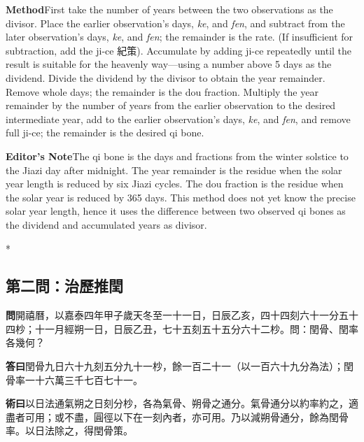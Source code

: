 \documentclass[11pt,a4paper]{article}
\newcommand{\WenCN}{\textbf{\color{headcolor}問}}
\newcommand{\DaCN}{\textbf{\color{headcolor}答曰}}
\newcommand{\ShuCN}{\textbf{\color{headcolor}術曰}}
\newcommand{\ShuEN}{\textbf{\color{headcolor}Method}}
\newcommand{\AnEN}{\textbf{\color{headcolor}Editor's Note}}
\begin{document}
\vspace{0.5em}
\ShuEN{}\quad First take the number of years between the two observations as the divisor. Place the earlier observation's days, \textit{ke}, and \textit{fen}, and subtract from the later observation's days, \textit{ke}, and \textit{fen}; the remainder is the rate. (If insufficient for subtraction, add the ji-ce 紀策). Accumulate by adding ji-ce repeatedly until the result is suitable for the heavenly way---using a number above 5 days as the dividend. Divide the dividend by the divisor to obtain the year remainder. Remove whole days; the remainder is the dou fraction. Multiply the year remainder by the number of years from the earlier observation to the desired intermediate year, add to the earlier observation's days, \textit{ke}, and \textit{fen}, and remove full ji-ce; the remainder is the desired qi bone.

\vspace{0.5em}
\AnEN{}\quad The qi bone is the days and fractions from the winter solstice to the Jiazi day after midnight. The year remainder is the residue when the solar year length is reduced by six Jiazi cycles. The dou fraction is the residue when the solar year is reduced by 365 days. This method does not yet know the precise solar year length, hence it uses the difference between two observed qi bones as the dividend and accumulated years as divisor.

\newpage

\switchcolumn[0]*
\subsection*{第二問：治歷推閏}

\vspace{0.5em}
\WenCN{}\quad 開禧曆，以嘉泰四年甲子歲天冬至一十一日，日辰乙亥，四十四刻六十一分五十四杪；十一月經朔一日，日辰乙丑，七十五刻五十五分六十二杪。問：閏骨、閏率各幾何？

\vspace{0.5em}
\DaCN{}\quad 閏骨九日六十九刻五分九十一杪，餘一百二十一（以一百六十九分為法）；閏骨率一十六萬三千七百七十一。

\vspace{0.5em}
\ShuCN{}\quad 以日法通氣朔之日刻分杪，各為氣骨、朔骨之通分。氣骨通分以約率約之，適盡者可用；或不盡，圓徑以下在一刻內者，亦可用。乃以減朔骨通分，餘為閏骨率。以日法除之，得閏骨策。
\end{document}
